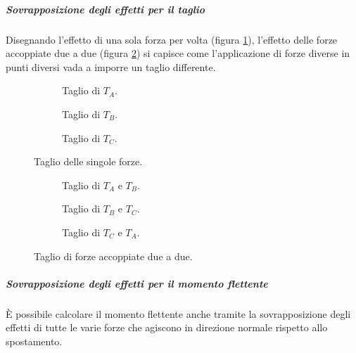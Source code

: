 \documentclass[main.tex]{subfiles}
\begin{document}
\subparagraph{Sovrapposizione degli effetti per il taglio}
Disegnando l'effetto di una sola forza per volta (figura \ref{taglio_forza_singola}), l'effetto delle forze accoppiate due a due  (figura \ref{taglio_coppia_forze}) si capisce come l'applicazione di forze diverse in punti diversi vada a imporre un taglio differente.

\begin{figure}[!tbp]
  \begin{subfigure}[b]{.3\textwidth}
  \centering
  \resizebox{.5\textwidth}{!}{}
  \caption{Taglio di $T_A$.}
  \end{subfigure}
  \hfill
  \begin{subfigure}[b]{.3\textwidth}
  \centering
  \resizebox{.5\textwidth}{!}{}
  \caption{Taglio di $T_B$.}
  \end{subfigure}
  \hfill
  \begin{subfigure}[b]{.3\textwidth}
  \centering
  \resizebox{.5\textwidth}{!}{}
  \caption{Taglio di $T_C$.}
  \end{subfigure}
  \caption{Taglio delle singole forze.}
  \label{taglio_forza_singola}
\end{figure}

\begin{figure}[!tbp]
  \begin{subfigure}[b]{.3\textwidth}
  \centering
  \resizebox{.5\textwidth}{!}{}
  \caption{Taglio di $T_A$ e $T_B$.}
  \end{subfigure}
  \hfill
  \begin{subfigure}[b]{.3\textwidth}
  \centering
  \resizebox{.5\textwidth}{!}{}
  \caption{Taglio di $T_B$ e $T_C$.}
  \end{subfigure}
  \hfill
  \begin{subfigure}[b]{.3\textwidth}
  \centering
  \resizebox{.5\textwidth}{!}{}
  \caption{Taglio di $T_C$ e $T_A$.}
  \end{subfigure}
  \caption{Taglio di forze accoppiate due a due.}
  \label{taglio_coppia_forze}
\end{figure}

\subparagraph{Sovrapposizione degli effetti per il momento flettente}
È possibile calcolare il momento flettente anche tramite la sovrapposizione degli effetti di tutte le varie forze che agiscono in direzione normale rispetto allo spostamento.
\end{document}
